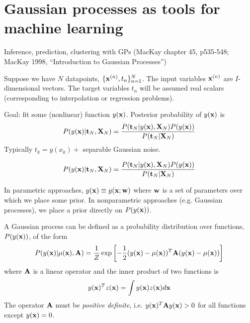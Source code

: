 \documentclass{beamer}
\begin{document}
\section{Gaussian processes as tools for machine learning}

\begin{frame}{}

\itemb
\item Inference, prediction, clustering with GPs (MacKay chapter 45, p535-548; MacKay 1998, ``Introduction to Gaussian Processes'')
 \itemb
 \item Suppose we have $N$ datapoints, $\{ {\bf x}^{(n)}, t_n \}_{n=1}^N$.
The input variables ${\bf x}^{(n)}$ are $I$-dimensional vectors.
The target variables $t_n$ will be assumed real scalars (corresponding to interpolation or regression problems).
 \item Goal: fit some (nonlinear) function $y({\bf x})$. Posterior probability of $y({\bf x})$ is
\[
P(y({\bf x})|{\bf t}_N,{\bf X}_N) = \frac{P({\bf t}_N|y({\bf x}),{\bf X}_N) P(y({\bf x}))}{P({\bf t}_N|{\bf X}_N)}
\]
Typically $t_k = y(x_k)+$ separable Gaussian noise.
\iteme
\iteme

\end{frame}

\begin{frame}{}

\[
P(y({\bf x})|{\bf t}_N,{\bf X}_N) = \frac{P({\bf t}_N|y({\bf x}),{\bf X}_N) P(y({\bf x}))}{P({\bf t}_N|{\bf X}_N)}
\]

\itemb
\item
In parametric approaches, $y({\bf x}) \equiv y({\bf x};{\bf w})$ where ${\bf w}$ is a set of parameters over which we place some prior.
In nonparametric approaches (e.g. Gaussian processes), we place a prior directly on $P(y({\bf x}))$.
\item A Gaussian process can be defined as a probability distribution over functions, $P(y({\bf x}))$, of the form
\[
P(y({\bf x})|\mu({\bf x}),{\bf A}) = \frac{1}{Z} \exp \left[ -\frac{1}{2} (y({\bf x})-\mu({\bf x}))^T {\bf A} (y({\bf x})-\mu({\bf x})) \right]
\]
where ${\bf A}$ is a linear operator and the inner product of two functions is
\[
y({\bf x})^T z({\bf x}) = \int y({\bf x}) z({\bf x}) d{\bf x}
\]
The operator ${\bf A}$ must be {\em positive definite}, i.e. $y({\bf x})^T {\bf A} y({\bf x}) > 0$ for all functions except $y({\bf x})=0$.
\iteme
\end{frame}
\end{document}
